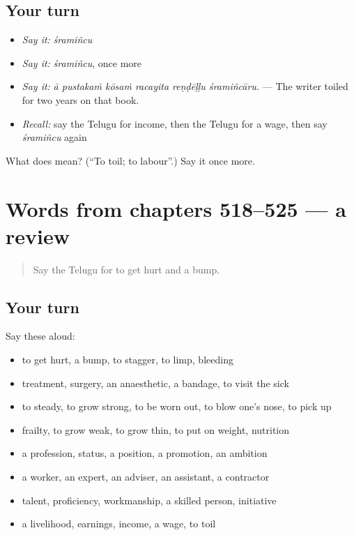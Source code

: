 \subsection*{Your turn}
\begin{itemize}
\raggedright
  \item \emph{Say it:} \emph{śramiñcu}
  \item \emph{Say it:} \emph{śramiñcu}, once more
  \item \emph{Say it:} \emph{ā pustakaṁ kōsaṁ racayita reṇḍēḷḷu śramiñcāru.} — The writer toiled for two years on that book.
  \item \emph{Recall:} say the Telugu for income, then the Telugu for a wage, then say \emph{śramiñcu} again
\end{itemize}

\begin{tcolorbox}[breakable,colback=teal!4,colframe=teal!35!black,title={Before you move on}]
What does  mean? (\textquotedblleft{}To toil; to labour\textquotedblright{}.) Say it once more.
\end{tcolorbox}
\section[(dialogue)]{Words from chapters 518–525 — a review}

\label{lesson:TE-R525-review-518-525}



\begin{quote}
Say the Telugu for to get hurt and a bump.
\end{quote}

\subsection*{Your turn}
Say these aloud:

\begin{itemize}
\raggedright
  \item to get hurt, a bump, to stagger, to limp, bleeding
  \item treatment, surgery, an anaesthetic, a bandage, to visit the sick
  \item to steady, to grow strong, to be worn out, to blow one's nose, to pick up
  \item frailty, to grow weak, to grow thin, to put on weight, nutrition
  \item a profession, status, a position, a promotion, an ambition
  \item a worker, an expert, an adviser, an assistant, a contractor
  \item talent, proficiency, workmanship, a skilled person, initiative
  \item a livelihood, earnings, income, a wage, to toil
\end{itemize}

